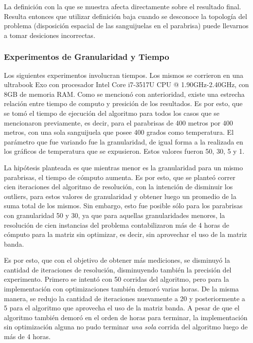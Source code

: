 	La definición con la que se muestra afecta directamente sobre el resultado final. Resulta entonces que utilizar definición baja cuando se desconoce la topología del problema (disposición espacial de las sanguijuelas en el parabrisa) puede llevarnos a tomar desiciones incorrectas.

\newpage
\subsubsection{Experimentos de Granularidad y Tiempo}	

\par 
	Los siguientes experimentos involucran tiempos. Los mismos se corrieron en una ultrabook Exo con procesador Intel Core i7-3517U CPU @ 1.90GHz-2.40GHz, con 8GB de memoria RAM.  
	Como se mencionó con anterioridad, existe una estrecha relación entre tiempo de computo y presición de los resultados. Es por esto, que se tomó el tiempo de ejecución del algoritmo para todos los casos que se mencionaron previamente, es decir, para el parabrisas de 400 metros por 400 metros, con una sola sanguijuela que posee 400 grados como temperatura. El parámetro que fue variando fue la granularidad, de igual forma a la realizada en los gráficos de temperatura que se expusieron. Estos valores fueron 50, 30, 5 y 1. 
	\par 
	La hipótesis planteada es que mientras menor es la granularidad para un mismo parabrisas, el tiempo de cómputo aumenta. Es por esto, que se planteó correr cien iteraciones del algoritmo de resolución, con la intención de disminuir los outliers, para estos valores de granularidad  y obtener luego un promedio de la suma total de los mismos. Sin embargo, esto fue posible sólo para los parabrisas con granularidad 50 y 30, ya que para aquellas granularidades menores, la resolución de cien instancias del problema contabilizaron más de 4 horas de cómputo para la matriz sin optimizar, es decir, sin aprovechar el uso de la matriz banda.
	\par 
	Es por esto, que con el objetivo de obtener más mediciones, se disminuyó la cantidad de iteraciones de resolución, disminuyendo también la precisión del experimento. Primero se intentó con 50 corridas del algoritmo, pero para la implementación con optimizaciones también demoró varias horas. De la misma manera, se redujo la cantidad de iteraciones nuevamente a 20 y posteriormente a 5 para el algoritmo que aprovecha el uso de la matriz banda. A pesar de que el algoritmo también demoró en el orden de horas para terminar, la implementación sin optimización alguna no pudo terminar \textit{una sola} corrida del algoritmo luego de más de 4 horas. 
